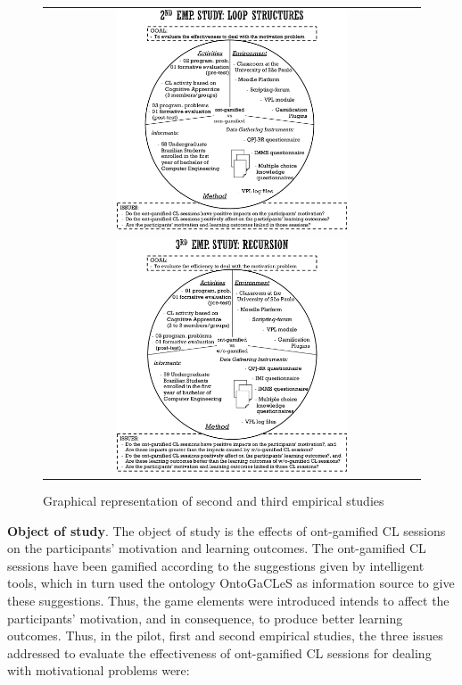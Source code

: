 \newpage
\begin{figure}[htb]
 \caption{Graphical representation of second and third empirical studies}
 \label{fig:graphical-second-third-empirical-study}
 \centering
 \begin{tabular}{c}
  \includegraphics[width=0.63\textwidth]{images/chap-evaluation/graphical-second-empirical-study}\\
  \includegraphics[width=0.63\textwidth]{images/chap-evaluation/graphical-third-empirical-study}
 \end{tabular}
 \fautor
\end{figure}

\newpage
\textbf{Object of study}.
The object of study is the effects of ont-gamified CL sessions on the participants' motivation and learning outcomes.
The ont-gamified CL sessions have been gamified according to the suggestions given by intelligent tools, which in turn used the ontology OntoGaCLeS as information source to give these suggestions. 
Thus, the game elements were introduced intends to affect the participants' motivation, and in consequence, to produce better learning outcomes.
Thus, in the pilot, first and second empirical studies, the three issues addressed to evaluate the effectiveness of ont-gamified CL sessions for dealing with motivational problems were:

